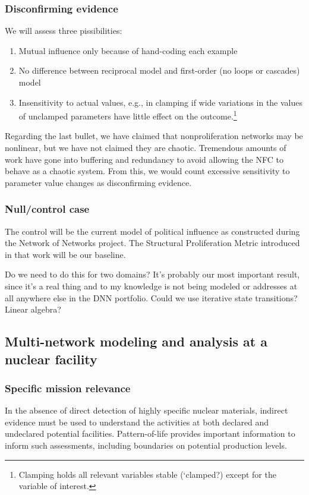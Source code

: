 \documentclass{article} %
\begin{document}
\subsubsection{Disconfirming evidence}
We will assess three pissibilities:
\begin{enumerate}
\item Mutual influence only because of hand-coding each example
\item No difference between reciprocal model and first-order (no loops or cascades) model 
\item Insensitivity to actual values, e.g., in clamping if wide variations in the values of unclamped parameters have little effect on the outcome.\footnote{Clamping holds all relevant variables stable (`clamped?) except for the variable of interest.}
\end{enumerate}
Regarding the last bullet, we have claimed that nonproliferation networks may be nonlinear, but we have not claimed they are chaotic. Tremendous amounts of work have gone into buffering and redundancy to avoid allowing the NFC to behave as a chaotic system. From this, we would count excessive sensitivity to parameter value changes as disconfirming evidence. 

\subsubsection{Null/control case}
The control will be the current model of political influence as constructed during the Network of Networks project. The Structural Proliferation Metric introduced in that work will be our baseline.

{\color {red} Do we need to do this for two domains? It's probably our most important result, since it's a real thing and to my knowledge is not being modeled or addresses at all anywhere else in the DNN portfolio. Could we use iterative state transitions? Linear algebra?}

\pagebreak
\subsection{Multi-network modeling and analysis at a nuclear facility}

\subsubsection{Specific mission relevance}
In the absence of direct detection of highly specific nuclear materials, indirect evidence must be used to understand the activities at both declared and undeclared potential facilities. Pattern-of-life provides important information to inform such assessments, including boundaries on potential production levels.
\end{document}
